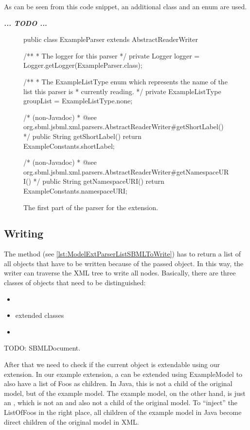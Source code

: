As can be seen from this code snippet, an additional class
 and an enum  are used.

\emph{\textbf{... TODO ...}}

\begin{figure}[htb]
  \begin{example}[numbers=left]
public class ExampleParser extends AbstractReaderWriter {

  /**
   * The logger for this parser
   */
  private Logger logger = Logger.getLogger(ExampleParser.class);

  /**
   * The ExampleListType enum which represents the name of the list this parser is
   * currently reading.
   */
  private ExampleListType groupList = ExampleListType.none;

  /* (non-Javadoc)
   * @see org.sbml.jsbml.xml.parsers.AbstractReaderWriter#getShortLabel()
   */
  public String getShortLabel() {
    return ExampleConstants.shortLabel;
  }

  /* (non-Javadoc)
   * @see org.sbml.jsbml.xml.parsers.AbstractReaderWriter#getNamespaceURI()
   */
  public String getNamespaceURI() {
    return ExampleConstants.namespaceURI;
  }

}\end{example}
 \caption{The first part of the parser for the extension.}
 \label{lst:ModelExtParserClass}
\end{figure}


\subsection{Writing}

The method  (see
\vref{lst:ModelExtParserListSBMLToWrite}) has to return a list of all
objects that have to be written because of the passed object.  In this way,
the writer can traverse the XML tree to write all nodes.  Basically, there
are three classes of objects that need to be distinguished:

\begin{itemize}
 \item {}
 \item extended classes
 \item {}
\end{itemize}

TODO: SBMLDocument.

After that we need to check if the current object is extendable using our
extension.  In our example extension, a \Model{} can be extended using
ExampleModel to also have a list of Foos as children.  In Java, this
 is not a child of the original model, but of the example
model.  The example model, on the other hand, is just an \SBasePlugin, which
is not an \SBase{} and also not a child of the original model.  To ``inject''
the ListOfFoos in the right place, all children of the example model in Java
become direct children of the original model in XML.

